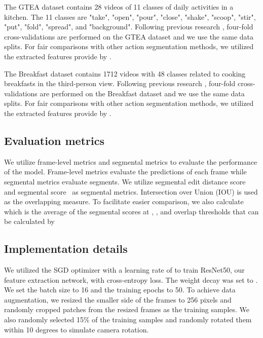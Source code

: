 \documentclass[sn-mathphys,Numbered]{sn-jnl}
\theoremstyle{thmstyleone}\newtheorem{theorem}{Theorem}\newtheorem{proposition}[theorem]{Proposition}
\theoremstyle{thmstyletwo}\newtheorem{example}{Example}\newtheorem{remark}{Remark}
\theoremstyle{thmstylethree}\newtheorem{definition}{Definition}
\begin{document}
The GTEA dataset \cite{fathi2011learning} contains 28 videos of 11 classes of daily activities in a kitchen. The 11 classes are "take", "open", "pour", "close", "shake", "scoop", "stir", "put", "fold", "spread", and "background". Following previous research \cite{farha2019ms,li2020ms,yi2021asformer,wang2022cross,park2022maximization,liu2023diffusion}, four-fold cross-validations are performed on the GTEA dataset and we use the same data splits. For fair comparisons with other action segmentation methods, we utilized the extracted features provide by \cite{farha2019ms}.

The Breakfast dataset \cite{kuehne2014language} contains 1712 videos with 48 classes related to cooking breakfasts in the third-person view. Following previous research \cite{farha2019ms,li2020ms,yi2021asformer,wang2022cross,park2022maximization,liu2023diffusion}, four-fold cross-validations are performed on the Breakfast dataset and we use the same data splits. For fair comparisons with other action segmentation methods, we utilized the extracted features provide by \cite{farha2019ms}.

\subsection{Evaluation metrics}
We utilize frame-level metrics \cite{twinanda2016endonet,wang2022less,funke2023metrics} and segmental metrics \cite{zhang2021swnet} to evaluate the performance of the model. Frame-level metrics evaluate the predictions of each frame while segmental metrics evaluate segments. We utilize segmental edit distance score~\cite{lea2016learning} and segmental  score~\cite{lea2017temporal} as segmental metrics. Intersection over Union (IOU) is used as the overlapping measure. To facilitate easier comparison, we also calculate  \cite{zhang2022surgicala} which is the average of the segmental  scores at , , and  overlap thresholds that can be calculated by



\subsection{Implementation details}
We utilized the SGD optimizer with a learning rate of  to train ResNet50, our feature extraction network, with cross-entropy loss. The weight decay was set to . We set the batch size to 16 and the training epochs to 50. To achieve data augmentation, we resized the smaller side of the frames to 256 pixels and randomly cropped  patches from the resized frames as the training samples. We also randomly selected 15\% of the training samples and randomly rotated them within 10 degrees to simulate camera rotation. 
\end{document}
